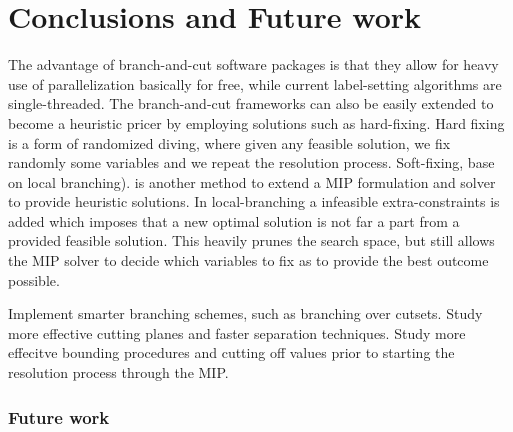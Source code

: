 \chapter{Conclusions and Future work}
\label{sec:conclusions-and-future-work}

The advantage of branch-and-cut software packages is that
they allow for heavy use of parallelization basically for free,
while current label-setting algorithms are single-threaded.
The branch-and-cut frameworks can also be easily extended
to become a heuristic pricer by employing
solutions such as hard-fixing.
Hard fixing is a form of randomized diving,
where given any feasible solution,
we fix randomly some variables and we repeat the resolution
process.
Soft-fixing, base on local branching). is another method
to extend a MIP formulation and solver to provide
heuristic solutions.
In local-branching a infeasible extra-constraints is added
which imposes that a new optimal solution
is not far a part from a provided feasible solution.
This heavily prunes the search space, but still
allows the MIP solver to decide which variables
to fix as to provide the best outcome possible.

Implement smarter branching schemes, such as branching over cutsets.
Study more effective cutting planes and
faster separation techniques.
Study more effecitve bounding procedures and cutting off values
prior to starting the resolution process through the MIP.

\subsection{Future work}

\begin{comment}
\cite{jepsen2011}
Although the main focus of this thesis is exact solution methods, it is impor-
tant to remember that in real life the computational time needed to find the
optimal solution is not always available therefore it is important that the
exact solution algorithms can find good solutions within reasonable time.
Danna and Le Pape [18] have shown how to integrate the Branch-and-Price
algorithm with a local search framework. This integration helps the bcp
algorithm with finding good integer solutions in the early stages of the al-
gorithm. The method has show to result in reasonable good solutions for
the vrptw. Prescott-Gagnon et al. [55] have improved the heuristic ap-
proach for bcp algorithms further by integrating the bcp algorithm with
large neighbourhood search. For bac algorithms methods such as local
branching introduced by Fischetti and Lodi [28] and the feasibility pump
introduced by Fischetti et al. [29] can be used to find fast and good solu-
tions. The main benefit of the exact solution approach is that it provides
both an upper and lower bound.
Though when a fast good solution is needed a heuristics such as the
adaptive large scale neighbourhood search by Pisinger and Ropke [54] for
cvrp, vrptw and many other Vehicle Routing variants or the local search
heuristic by Zachariadis and Kiranoudis [65] are preferable.
\end{comment}
